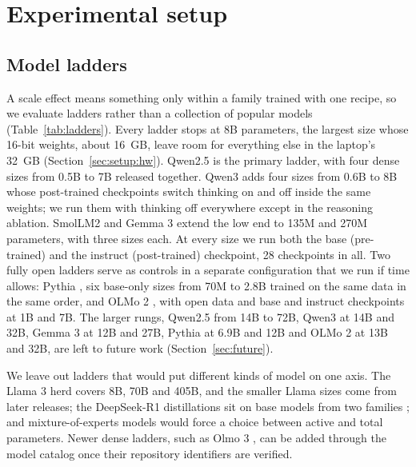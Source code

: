 \section{Experimental setup}
\label{sec:setup}

\subsection{Model ladders}
\label{sec:setup:models}

A scale effect means something only within a family trained with one recipe, so we evaluate ladders rather than a collection of popular models (Table~\ref{tab:ladders}). Every ladder stops at 8B parameters, the largest size whose 16-bit weights, about 16~GB, leave room for everything else in the laptop's 32~GB (Section~\ref{sec:setup:hw}). Qwen2.5 \citep{qwen2024qwen25} is the primary ladder, with four dense sizes from 0.5B to 7B released together. Qwen3 \citep{yang2025qwen3} adds four sizes from 0.6B to 8B whose post-trained checkpoints switch thinking on and off inside the same weights; we run them with thinking off everywhere except in the reasoning ablation. SmolLM2 \citep{allal2025smollm2} and Gemma 3 \citep{gemma2025gemma3} extend the low end to 135M and 270M parameters, with three sizes each. At every size we run both the base (pre-trained) and the instruct (post-trained) checkpoint, 28 checkpoints in all. Two fully open ladders serve as controls in a separate configuration that we run if time allows: Pythia \citep{biderman2023pythia}, six base-only sizes from 70M to 2.8B trained on the same data in the same order, and OLMo 2 \citep{olmo2025olmo2}, with open data and base and instruct checkpoints at 1B and 7B. The larger rungs, Qwen2.5 from 14B to 72B, Qwen3 at 14B and 32B, Gemma 3 at 12B and 27B, Pythia at 6.9B and 12B and OLMo 2 at 13B and 32B, are left to future work (Section~\ref{sec:future}).

We leave out ladders that would put different kinds of model on one axis. The Llama 3 herd \citep{grattafiori2024llama3} covers 8B, 70B and 405B, and the smaller Llama sizes come from later releases; the DeepSeek-R1 distillations sit on base models from two families \citep{deepseekai2025r1}; and mixture-of-experts models would force a choice between active and total parameters. Newer dense ladders, such as Olmo 3 \citep{olmo2025olmo3}, can be added through the model catalog once their repository identifiers are verified.

